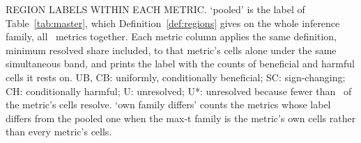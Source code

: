 \begin{table}[t]
{}
\caption{REGION LABELS WITHIN EACH METRIC. `pooled' is the label of Table~\ref{tab:master}, which Definition~\ref{def:regions} gives on the whole inference family, all \nInstruments\ metrics together. Each metric column applies the same definition, minimum resolved share included, to that metric's cells alone under the same simultaneous band, and prints the label with the counts of beneficial and harmful cells it rests on. UB, CB: uniformly, conditionally beneficial; SC: sign-changing; CH: conditionally harmful; U: unresolved; U*: unresolved because fewer than \minResolvedSharePct\ of the metric's cells resolve. `own family differs' counts the metrics whose label differs from the pooled one when the max-t family is the metric's own cells rather than every metric's cells.}
\label{tab:metricregions}
\end{table}

